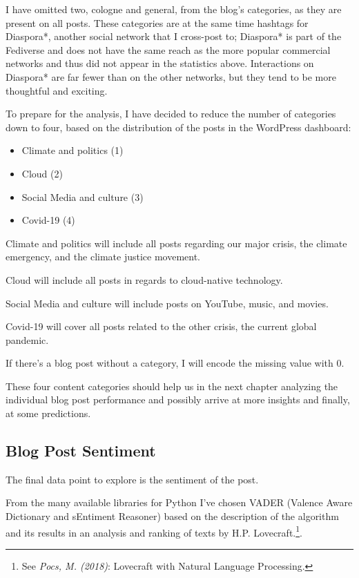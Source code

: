 I have omitted two, cologne and general, from the blog's categories, as they are present on all posts. These categories are at the same time hashtags for Diaspora*, another social network that I cross-post to; Diaspora* is part of the Fediverse and does not have the same reach as the more popular commercial networks and thus did not appear in the statistics above. Interactions on Diaspora* are far fewer than on the other networks, but they tend to be more thoughtful and exciting.

To prepare for the analysis, I have decided to reduce the number of categories down to four, based on the distribution of the posts in the WordPress dashboard:

\begin{itemize}
\item Climate and politics (1)
\item Cloud (2)
\item Social Media and culture (3)
\item Covid-19 (4)
\end{itemize}

Climate and politics will include all posts regarding our major crisis, the climate emergency, and the climate justice movement.

Cloud will include all posts in regards to cloud-native technology.

Social Media and culture will include posts on YouTube, music, and movies.

Covid-19 will cover all posts related to the other crisis, the current global pandemic.

 If there's a blog post without a category, I will encode the missing value with 0.

These four content categories should help us in the next chapter analyzing the individual blog post performance and possibly arrive at more insights and finally, at some predictions.

\subsection{Blog Post Sentiment}

The final data point to explore is the sentiment of the post.

From the many available libraries for Python I've chosen VADER (Valence Aware Dictionary and sEntiment Reasoner) based on the description of the algorithm and its results in an analysis and ranking of texts by H.P. Lovecraft.\footnote{See \textit{Pocs, M. (2018)}: Lovecraft with Natural Language Processing.\cite{lovecraftAnalysis}}.

